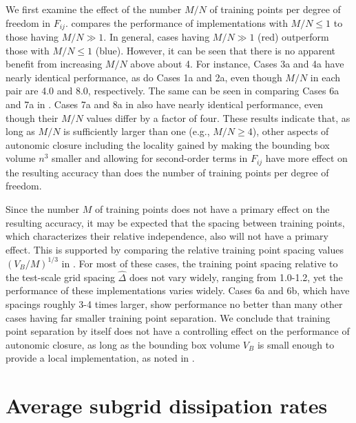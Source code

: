 We first examine the effect of the number  $M/N$ of training points per degree of freedom 
in $F_{ij}$.   compares the performance of implementations with $M/N \leq 1$  to those having $M/N \gg 1$. In general, cases having  $M/N \gg 1$ (red) outperform those with  $M/N \leq 1$ (blue). However, it can be seen that there is no apparent benefit from increasing $M/N$ above about 4. For instance, Cases 3a and 4a have nearly identical performance, as do Cases 1a and 2a, even though  $M/N$ in each pair are 4.0 and 8.0, respectively. The same can be seen in comparing Cases 6a and 7a in . Cases 7a and 8a in  also have nearly identical performance, even though their $M/N$ values differ by a factor of four. These results indicate that, as long as $M/N$  is sufficiently larger than one (e.g., $M/N \geq 4$), other aspects of autonomic closure including the locality gained by making the bounding box volume  $n^3$ smaller and allowing for second-order terms in $F_{ij}$  have more effect on the resulting accuracy than does the number of training points per degree of freedom.

Since the number $M$ of training points does not have a primary effect on the resulting accuracy, it may be expected that the spacing between training points, which characterizes their relative independence, also will not have a primary effect. This is supported by comparing the relative training point spacing values $(V_B/M)^{1/3}$ in . For most of these cases, the training point spacing relative to the test-scale grid spacing $\widehat{\Delta}$  does not vary widely, ranging from 1.0-1.2, yet the performance of these implementations varies widely. Cases 6a and 6b, which have spacings roughly 3-4 times larger, show performance no better than many other cases having far smaller training point separation. We conclude that training point separation by itself does not have a controlling effect on the performance of autonomic closure, as long as the bounding box volume  $V_B$ is small enough to provide a local implementation, as noted in .

\section{Average subgrid dissipation rates}
\label{sec:IVF}

